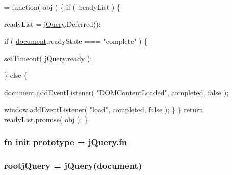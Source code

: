 \begin{DoxyCode}
= \textcolor{keyword}{function}( obj ) \{
    \textcolor{keywordflow}{if} ( !readyList ) \{

        readyList = \hyperlink{docs_2media_2js_2jquery_8js_a1e853eabf9d8ee3ac2700c9a2ddda672}{jQuery}.Deferred();

        
        
        
        \textcolor{keywordflow}{if} ( \hyperlink{_col_reorder_8js_aa14f8e0338cced6720590fd2ea13bd4b}{document}.readyState === \textcolor{stringliteral}{"complete"} ) \{
            
            setTimeout( \hyperlink{docs_2media_2js_2jquery_8js_a1e853eabf9d8ee3ac2700c9a2ddda672}{jQuery}.ready );

        \} \textcolor{keywordflow}{else} \{

            
            \hyperlink{_col_reorder_8js_aa14f8e0338cced6720590fd2ea13bd4b}{document}.addEventListener( \textcolor{stringliteral}{"DOMContentLoaded"}, completed, \textcolor{keyword}{false} );

            
            \hyperlink{jquery-2_80_83_8js_ad55530ae1e5978df8e721017c1fc8466}{window}.addEventListener( \textcolor{stringliteral}{"load"}, completed, \textcolor{keyword}{false} );
        \}
    \}
    \textcolor{keywordflow}{return} readyList.promise( obj );
\}
\end{DoxyCode}
\hypertarget{jquery-2_80_83_8js_a7ef9b7a13e7ecdb967f1b98b4ada2470}{
\subsubsection[{prototype}]{ {\bf fn} {\bf init} prototype = {\bf j\+Query.\+fn}}}\label{jquery-2_80_83_8js_a7ef9b7a13e7ecdb967f1b98b4ada2470}
\hypertarget{jquery-2_80_83_8js_a8101d493767b94ebb7b6d5650b0809bf}{
\subsubsection[{rootj\+Query}]{\setlength{\rightskip}{0pt plus 5cm}rootj\+Query = {\bf j\+Query}({\bf document})}}\label{jquery-2_80_83_8js_a8101d493767b94ebb7b6d5650b0809bf}
